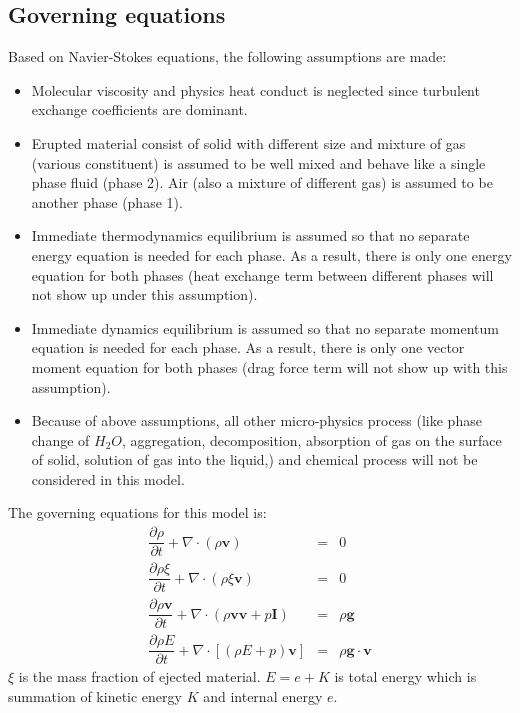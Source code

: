 \documentclass[10pt,a4paper]{article}
\begin{document}
\subsection{Governing equations\cite{suzuki2005numerical}}
Based on Navier-Stokes equations, the following assumptions are made:
\begin{itemize}
\item Molecular viscosity and physics heat conduct is neglected since turbulent exchange coefficients are dominant.
\item Erupted material consist of solid with different size and mixture of gas (various constituent) is assumed to be well mixed and behave like a single phase fluid (phase 2). Air (also a mixture of different gas) is assumed to be another phase (phase 1).
\item Immediate thermodynamics equilibrium is assumed so that no separate energy equation is needed for each phase. As a result, there is only one energy equation for both phases (heat exchange term between different phases will not show up under this assumption). 
\item Immediate dynamics equilibrium is assumed so that no separate momentum equation is needed for each phase. As a result, there is only one vector moment equation for both phases (drag force term will not show up with this assumption).
\item Because of above assumptions, all other micro-physics process (like phase change of $H_2O$, aggregation, decomposition, absorption of gas on the surface of solid, solution of gas into the liquid,) and chemical process will not be considered in this model.
\end{itemize} 
The governing equations for this model is:
\begin{eqnarray}
\dfrac{\partial \rho}{\partial t} + \nabla \cdot (\rho \textbf{v}) &=& 0 \label{eq:gov-cs-rho} \\
\dfrac{\partial \rho \xi}{\partial t} + \nabla \cdot (\rho \xi \textbf{v}) &=& 0 \label{eq:gov-cs-ks}\\
\dfrac{\partial \rho \textbf{v}}{\partial t} + \nabla \cdot (\rho \textbf{v} \textbf{v} + p\textbf{I}) &=& \rho \textbf{g} \label{eq:gov-cs-v} \\
\dfrac{\partial \rho E}{\partial t} + \nabla \cdot [(\rho E + p )\textbf{v}] &=& \rho \textbf{g} \cdot\textbf{v} \label{eq:gov-cs-e}
\end{eqnarray}
$\xi$ is the mass fraction of ejected material.
$E = e + K $ is total energy which is summation of kinetic energy $K$ and internal energy $e$.
\end{document}
